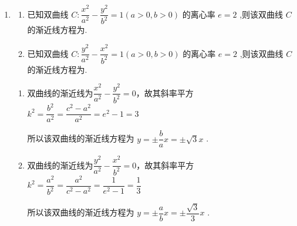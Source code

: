 \begin{enumerate}
    \begin{jieda}
        由方程 $\dfrac{{x}^{2}}{{a}^{2}} - \dfrac{{y}^{2}}{{b}^{2}} = 1$，得双曲线的渐近线方程为 $y =  \pm  \dfrac{b}{a}x$
        
        不妨设 $A$ 在直线 $y = \dfrac{b}{a}x$ 上，由 $\bigtriangleup {OAF}$ 是边长为 2 的等边三角形可得 $c = 2$ ,直线 $y = \dfrac{b}{a}x$ 的倾斜角为 ${60}^{ \circ  }$，即 $\dfrac{b}{a} = \sqrt{3}$ ,
        
        联立 $\left\{  {\begin{array}{l} b = \sqrt{3}a, \\  {a}^{2} + {b}^{2} = {c}^{2} = 4, \end{array}\text{ 可得 }\left\{  \begin{array}{l} b = \sqrt{3}, \\  a = 1, \end{array}\right. }\right.$
        
        故双曲线的标准方程为 ${x}^{2} - \dfrac{{y}^{2}}{3} = 1$ .
    \end{jieda}
    \item 
    \begin{enumerate}
        \item 已知双曲线 $C : \dfrac{{x}^{2}}{{a}^{2}} - \dfrac{{y}^{2}}{{b}^{2}} = 1\left( {a > 0,b > 0}\right)$ 的离心率 $e = 2$ ,则该双曲线 $C$ 的渐近线方程为.
        \item 已知双曲线 $C : \dfrac{{y}^{2}}{{a}^{2}} - \dfrac{{x}^{2}}{{b}^{2}} = 1\left( {a > 0,b > 0}\right)$ 的离心率 $e = 2$ ,则该双曲线 $C$ 的渐近线方程为.
    \end{enumerate}
    

    \begin{jieda}
        \begin{enumerate}
            \item 双曲线的渐近线为$\dfrac{{x}^{2}}{{a}^{2}} - \dfrac{{y}^{2}}{{b}^{2}} = 0$，故其斜率平方$k^2 = \dfrac{b^2}{a^2} = \dfrac{c^2-a^2}{a^2} = e^2 - 1 = 3$
        
            所以该双曲线的渐近线方程为 $y =  \pm  \dfrac{b}{a}x =  \pm  \sqrt{3}x$ .
            \item 双曲线的渐近线为$\dfrac{{y}^{2}}{{a}^{2}} - \dfrac{{x}^{2}}{{b}^{2}} = 0$，故其斜率平方$k^2 = \dfrac{a^2}{b^2} = \dfrac{a^2}{c^2-a^2} = \dfrac{1}{e^2 - 1} = \dfrac{1}{3}$
        
            所以该双曲线的渐近线方程为 $y =  \pm  \dfrac{a}{b}x =  \pm  \dfrac{\sqrt{3}}{3}x$ .
        \end{enumerate}
        

\end{jieda}
\end{enumerate}

